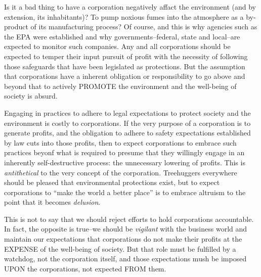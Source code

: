 Is it a bad thing to have a corporation negatively affact the environment (and by extension, its inhabitants)?
To pump noxious fumes into the atmosphere as a by-product of its manufacturing process?
Of course, and this is why agencies such as the EPA were established and why governments--federal, state and local--are expected to monitor such companies.
Any and all corporations should be expected to temper their input pursuit of profit with the necessity of following those safeguards that have been legislated as protections.
But the assumption that corporations have a inherent obligation or responsibility to go above and beyond that to actively PROMOTE the environment and the well-being of society is absurd.

Engaging in practices to adhere to legal expectations to protect society and the environment is costly to corporations.
If the very purpose of a corporation is to generate profits, and the obligation to adhere to safety expectations established by law cuts into those profits, then to expect corporations to embrace such practices beyonf what is required to presume that they willingly engage in an inherently self-destructive process: the unnecessary lowering of profits.
This is \emph{antithetical} to the very concept of the corporation.
Treehuggers everywhere should be pleased that environmental protections exist, but to expect corporations to ``make the world a better place'' is to embrace altruism to the point that it becomes \emph{delusion}.

This is not to say that we should reject efforts to hold corporations accountable.
In fact, the opposite is true--we should be \emph{vigilant} with the business world and maintain our expectations that corporations do not make their profits at the EXPENSE of the well-being of society.
But that role must be fulfilled by a watchdog, not the corporation itself, and those expectations mush be imposed UPON the corporations, not expected FROM them.